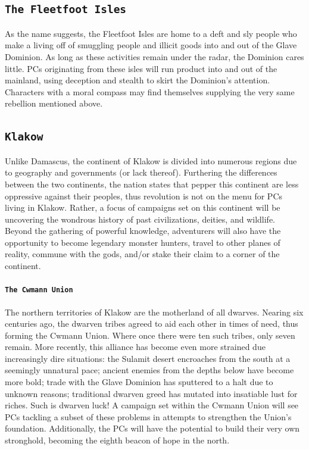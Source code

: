 \documentclass[12pt]{article}
\begin{document}
\subsection*{\texttt{The Fleetfoot Isles}} 
\textsf{As the name suggests, the Fleetfoot Isles are home to a deft and sly people who make a living off of smuggling people and illicit goods into and out of the Glave Dominion. As long as these activities remain under the radar, the Dominion cares little. PCs originating from these isles will run product into and out of the mainland, using deception and stealth to skirt the Dominion's attention. Characters with a moral compass may find themselves supplying the very same rebellion mentioned above.}

\subsection*{\texttt{Klakow}} 
\textsf{Unlike Damascus, the continent of Klakow is divided into numerous regions due to geography and governments (or lack thereof). Furthering the differences between the two continents, the nation states that pepper this continent are less oppressive against their peoples, thus revolution is not on the menu for PCs living in Klakow. Rather, a focus of campaigns set on this continent will be uncovering the wondrous history of past civilizations, deities, and wildlife. Beyond the gathering of powerful knowledge, adventurers will also have the opportunity to become legendary monster hunters, travel to other planes of reality, commune with the gods, and/or stake their claim to a corner of the continent.}

\paragraph{\texttt{The Cwmann Union}} 
\textsf{The northern territories of Klakow are the motherland of all dwarves. Nearing six centuries ago, the dwarven tribes agreed to aid each other in times of need, thus forming the Cwmann Union. Where once there were ten such tribes, only seven remain. More recently, this alliance has become even more strained due increasingly dire situations: the Sulamit desert encroaches from the south at a seemingly unnatural pace; ancient enemies from the depths below have become more bold; trade with the Glave Dominion has sputtered to a halt due to unknown reasons; traditional dwarven greed has mutated into insatiable lust for riches. Such is dwarven luck! A campaign set within the Cwmann Union will see PCs tackling a subset of these problems in attempts to strengthen the Union's foundation. Additionally, the PCs will have the potential to build their very own stronghold, becoming the eighth beacon of hope in the north.}
\end{document}
